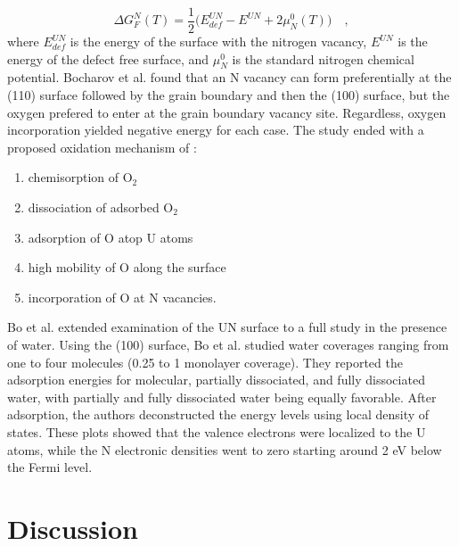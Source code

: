 \documentclass[11pt]{article}
\begin{document}
\begin{equation}
\Delta G^{N}_{F}(T) = \frac{1}{2} \bigg(E^{UN}_{def}-E^{UN}+2\mu _{N}^{0}(T)\bigg) \quad ,
\end{equation} 
where $E^{UN}_{def}$ is the energy of the surface with the nitrogen vacancy, $E^{UN}$ is the energy of the defect free surface, and $\mu _{N}^{0}$ is the standard nitrogen chemical potential. Bocharov et al. found that an N vacancy can form preferentially at the (110) surface followed by the grain boundary and then the (100) surface, but the oxygen prefered to enter at the grain boundary vacancy site. Regardless, oxygen incorporation yielded negative energy for each case. The study ended with a proposed oxidation mechanism of \cite{Bocharov2013}: 
\begin{enumerate}
	\item chemisorption of O$_{2}$
	\item dissociation of adsorbed O$_{2}$
	\item adsorption of O atop U atoms
	\item high mobility of O along the surface
	\item incorporation of O at N vacancies.
\end{enumerate}
\par 
Bo et al. \cite{Bo2016} extended examination of the UN surface to a full study in the presence of water. Using the (100) surface, Bo et al. studied water coverages ranging from one to four molecules (0.25 to 1 monolayer coverage). They reported the adsorption energies for molecular, partially dissociated, and fully dissociated water, with partially and fully dissociated water being equally favorable. After adsorption, the authors deconstructed the energy levels using local density of states. These plots showed that the valence electrons were localized to the U atoms, while the N electronic densities went to zero starting around 2 eV below the Fermi level.

\section{Discussion}
\end{document}
